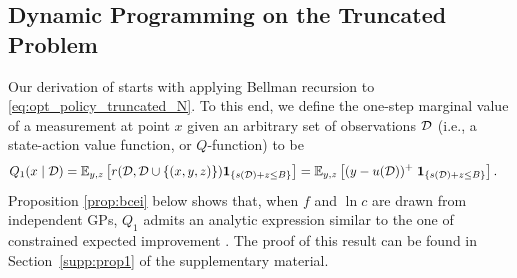 

\subsection{Dynamic Programming on the Truncated Problem}
\label{subsec:bellman}
Our derivation of \BMSEI{} starts with applying Bellman recursion to \eqref{eq:opt_policy_truncated_N}. To this end, we define the one-step marginal value of a measurement at point $x$ given an arbitrary set of observations $\mathcal{D}$ (i.e., a state-action value function, or $Q$-function) to be
\begin{align*}
    Q_1(x \mid \mathcal{D}) &= \mathbb{E}_{y,z}\left[ r(\mathcal{D}, \mathcal{D} \cup \{(x, y, z)\}) \mathbf{1}_{\{s(\mathcal{D}) + z \leq B\}} \right]
    = \mathbb{E}_{y,z}\left[(y - u(\mathcal{D}))^+\; \mathbf{1}_{\{s(\mathcal{D}) + z \leq B\}}\right].
\end{align*}
Proposition \ref{prop:bcei} below shows that, when $f$ and $\ln c$ are drawn from independent GPs, $Q_1$ admits an analytic expression similar to the one of constrained expected improvement \citep{schonlau1998global,gardner14}. The proof of this result can be found in Section~\ref{supp:prop1} of the supplementary material.


